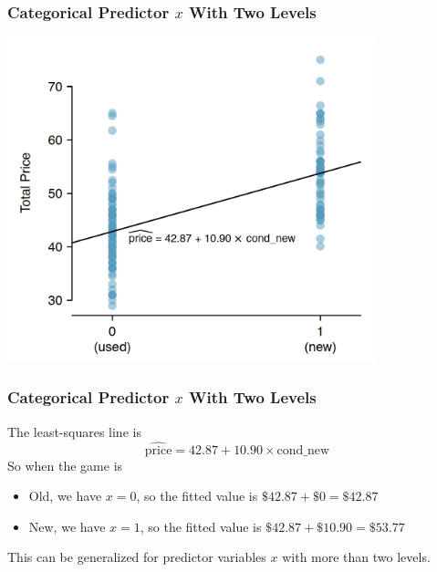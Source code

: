 \documentclass[slides]{beamer}
\begin{document}
\begin{frame}[fragile]
\frametitle{Categorical Predictor $x$ With Two Levels}

\begin{center}
\includegraphics[width=0.8\textwidth]{figure/mario_kart.png}
\end{center}

\end{frame}


\begin{frame}[fragile]
\frametitle{Categorical Predictor $x$ With Two Levels}
The least-squares line is
\[
\widehat{\mbox{price}} = 42.87 + 10.90 \times \mbox{cond\_new}
\]
\pause
So when the game is
\begin{itemize}
\item Old, we have $x=0$, so the fitted value is $\$42.87 + \$0 = \$42.87$
\item New, we have $x=1$, so the fitted value is $\$42.87 + \$10.90 = \$53.77$
\end{itemize}
\pause
This can be generalized for predictor variables $x$ with more than two levels.

\end{frame}
\end{document}
